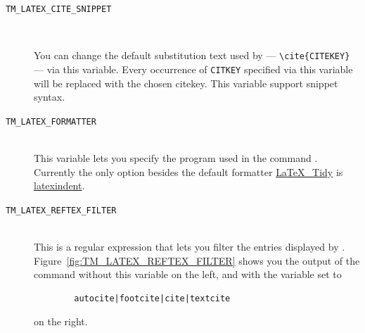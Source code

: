 \documentclass[11pt, x11names]{article}
\begin{document}
\begin{description}

    \item[\texttt{TM\_LATEX\_CITE\_SNIPPET}]~\\

    \begin{sloppypar}
    You can change the default substitution text used by  — \verb|\cite{CITEKEY}| — via this variable. Every occurrence of \texttt{CITKEY} specified via this variable will be replaced with the chosen citekey. This variable support snippet syntax.
    \end{sloppypar}

    \item[\texttt{TM\_LATEX\_FORMATTER}]~\\

    This variable lets you specify the program used in the command . Currently the only option besides the default formatter \href{http://bfc.sfsu.edu/cgi-bin/hsu.pl?LaTeX_Tidy}{LaTeX\_Tidy} is \href{https://github.com/cmhughes/latexindent.pl}{latexindent}.

    \item[\texttt{TM\_LATEX\_REFTEX\_FILTER}]~\\

    This is a regular expression that lets you filter the entries displayed by . Figure~\ref{fig:TM_LATEX_REFTEX_FILTER} shows you the output of the command without this variable on the left, and with the variable set to
    \begin{verbatim}
        autocite|footcite|cite|textcite
    \end{verbatim}
    on the right.


\end{description}
\end{document}

